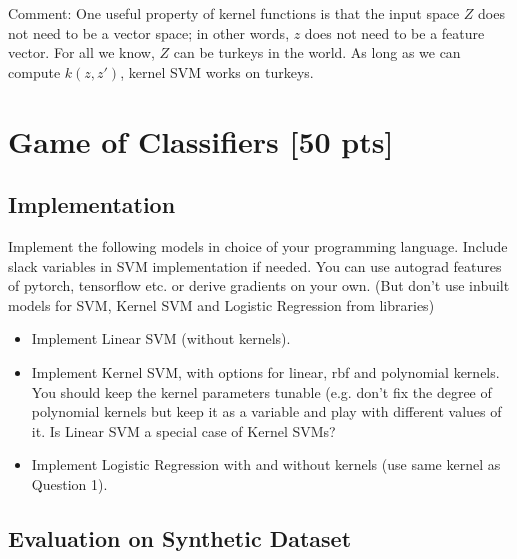 \documentclass[a4paper]{article}
\theoremstyle{definition}
\begin{document}
Comment: One useful property of kernel functions is that the input space $Z$ does not need to be a vector space; in other words, $z$ does not need to be a feature vector.  For all we know, $Z$ can be turkeys in the world.  As long as we can compute $k(z,z')$, kernel SVM works on turkeys.

\section{Game of Classifiers [50 pts]}
 \subsection{Implementation}
  Implement the following models in choice of your programming language. Include slack variables in SVM implementation if needed. You can use autograd features of pytorch, tensorflow etc. or derive gradients on your own. (But don't use inbuilt models for SVM, Kernel SVM and Logistic Regression from libraries)
  
  \begin{itemize}
      \item Implement Linear SVM (without kernels). 
      \item Implement Kernel SVM, with options for linear, rbf and polynomial kernels. You should keep the kernel parameters tunable (e.g. don't fix the degree of polynomial kernels but keep it as a variable and play with different values of it. Is Linear SVM a special case of Kernel SVMs?
      \item Implement Logistic Regression with and without kernels (use same kernel as Question 1).
      
  \end{itemize}
 \subsection{Evaluation on Synthetic Dataset}
\end{document}
